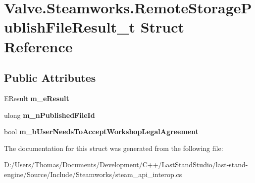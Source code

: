 \hypertarget{structValve_1_1Steamworks_1_1RemoteStoragePublishFileResult__t}{}\section{Valve.\+Steamworks.\+Remote\+Storage\+Publish\+File\+Result\+\_\+t Struct Reference}
\label{structValve_1_1Steamworks_1_1RemoteStoragePublishFileResult__t}
\subsection*{Public Attributes}
\begin{DoxyCompactItemize}
\item 
\hypertarget{structValve_1_1Steamworks_1_1RemoteStoragePublishFileResult__t_ad92d7e5e27fa577e0b56f327a28addf4}{}E\+Result {\bfseries m\+\_\+e\+Result}\label{structValve_1_1Steamworks_1_1RemoteStoragePublishFileResult__t_ad92d7e5e27fa577e0b56f327a28addf4}

\item 
\hypertarget{structValve_1_1Steamworks_1_1RemoteStoragePublishFileResult__t_aee77c0d72f1e5ad3829b1f93605d502b}{}ulong {\bfseries m\+\_\+n\+Published\+File\+Id}\label{structValve_1_1Steamworks_1_1RemoteStoragePublishFileResult__t_aee77c0d72f1e5ad3829b1f93605d502b}

\item 
\hypertarget{structValve_1_1Steamworks_1_1RemoteStoragePublishFileResult__t_a4497bfed3667e529c7ce0682e32a4679}{}bool {\bfseries m\+\_\+b\+User\+Needs\+To\+Accept\+Workshop\+Legal\+Agreement}\label{structValve_1_1Steamworks_1_1RemoteStoragePublishFileResult__t_a4497bfed3667e529c7ce0682e32a4679}

\end{DoxyCompactItemize}


The documentation for this struct was generated from the following file\+:\begin{DoxyCompactItemize}
\item 
D\+:/\+Users/\+Thomas/\+Documents/\+Development/\+C++/\+Last\+Stand\+Studio/last-\/stand-\/engine/\+Source/\+Include/\+Steamworks/steam\+\_\+api\+\_\+interop.\+cs\end{DoxyCompactItemize}
